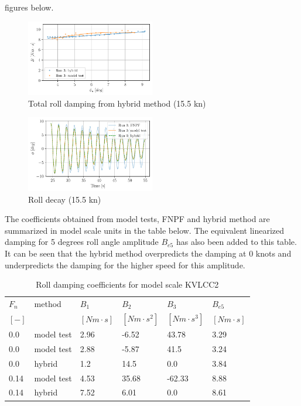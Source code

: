 figures below.
\begin{figure}[H]
\begin{center}\includegraphics[width = 0.5\textwidth]{figures/hybrid_speed_amplitudes.pdf}\end{center}
\vspace{-1cm}
\caption{Total roll damping from hybrid method (15.5 kn)}
\label{fig:hybrid_speed_amplitudes}
\end{figure}
\begin{figure}[H]
\begin{center}\includegraphics[width = 0.5\textwidth]{figures/hybrid_speed_time.pdf}\end{center}
\vspace{-1cm}
\caption{Roll decay (15.5 kn)}
\label{fig:hybrid_speed_time}
\end{figure}
The coefficients obtained from model tests, FNPF and hybrid method are
summarized in model scale units in the table below. The equivalent
linearized damping for 5 degrees roll angle amplitude $B_{e5}$ has
also been added to this table. It can be seen that the hybrid method
overpredicts the damping at 0 knots and underpredicts the damping for
the higher speed for this amplitude.
\begin{table}[H]
\scriptsize
\center
\caption{Roll damping coefficients for model scale KVLCC2}
\label{tab:results}
\begin{tabular}{|l|l|l|l|l|l|}
\hline\addlinespace
$F_n$ & method & $B_1$ & $B_2$ & $B_3$ & $B_{e5}$\\
$[-]$ &  & $[Nm \cdot s]$ & $[Nm \cdot s^2]$ & $[Nm \cdot s^3]$ & $[Nm \cdot s]$\\
\hline0.0 & model test & 2.96 & -6.52 & 43.78 & 3.29\\
0.0 & model test & 2.88 & -5.87 & 41.5 & 3.24\\
0.0 & hybrid & 1.2 & 14.5 & 0.0 & 3.84\\
0.14 & model test & 4.53 & 35.68 & -62.33 & 8.88\\
0.14 & hybrid & 7.52 & 6.01 & 0.0 & 8.61\\
\hline
\end{tabular}
\end{table}
